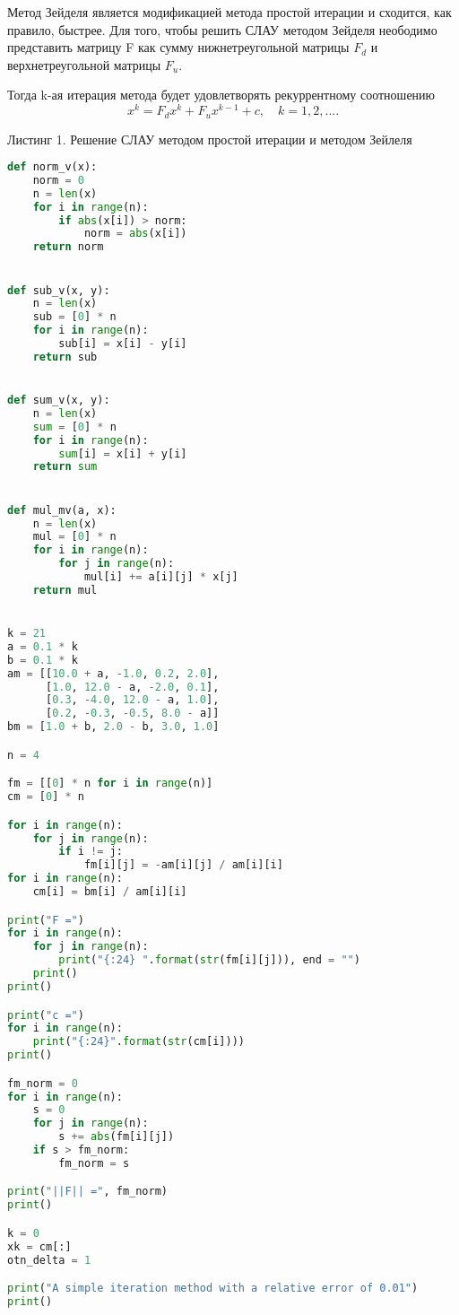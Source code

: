 \documentclass [12pt]{article}
\begin{document}
Метод Зейделя является модификацией метода простой итерации и сходится, как правило, быстрее. Для того, чтобы решить СЛАУ методом Зейделя неободимо представить матрицу F как сумму нижнетреугольной матрицы $F_{d}$ и верхнетреугольной матрицы $F_{u}$.

Тогда k-ая итерация метода будет удовлетворять рекуррентному соотношению $$ x^k = F_{d}x^k + F_{u}x^{k-1} + c, \quad k = 1,2,....$$

Листинг 1. Решение СЛАУ методом простой итерации и методом Зейлеля

\begin{lstlisting}[language=python]
def norm_v(x):
    norm = 0
    n = len(x)
    for i in range(n):
        if abs(x[i]) > norm:
            norm = abs(x[i])
    return norm


def sub_v(x, y):
    n = len(x)
    sub = [0] * n
    for i in range(n):
        sub[i] = x[i] - y[i]
    return sub


def sum_v(x, y):
    n = len(x)
    sum = [0] * n
    for i in range(n):
        sum[i] = x[i] + y[i]
    return sum


def mul_mv(a, x):
    n = len(x)
    mul = [0] * n
    for i in range(n):
        for j in range(n):
            mul[i] += a[i][j] * x[j]
    return mul


k = 21
a = 0.1 * k
b = 0.1 * k
am = [[10.0 + a, -1.0, 0.2, 2.0],
      [1.0, 12.0 - a, -2.0, 0.1],
      [0.3, -4.0, 12.0 - a, 1.0],
      [0.2, -0.3, -0.5, 8.0 - a]]
bm = [1.0 + b, 2.0 - b, 3.0, 1.0]

n = 4

fm = [[0] * n for i in range(n)]
cm = [0] * n

for i in range(n):
    for j in range(n):
        if i != j:
            fm[i][j] = -am[i][j] / am[i][i]
for i in range(n):
    cm[i] = bm[i] / am[i][i]

print("F =")
for i in range(n):
    for j in range(n):
        print("{:24} ".format(str(fm[i][j])), end = "")
    print()
print()

print("c =")
for i in range(n):
    print("{:24}".format(str(cm[i])))
print()

fm_norm = 0
for i in range(n):
    s = 0
    for j in range(n):
        s += abs(fm[i][j])
    if s > fm_norm:
        fm_norm = s

print("||F|| =", fm_norm)
print()

k = 0
xk = cm[:]
otn_delta = 1

print("A simple iteration method with a relative error of 0.01")
print()


\end{lstlisting}
\end{document}
